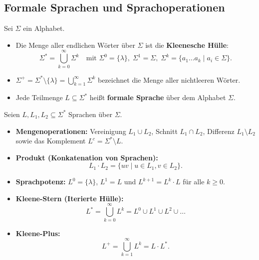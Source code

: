 \subsection{Formale Sprachen und Sprachoperationen}

\begin{definition}
    Sei $\Sigma$ ein Alphabet.
    \begin{itemize}
        \item Die Menge aller endlichen Wörter über $\Sigma$ ist die \textbf{Kleenesche Hülle}:
        \[
            \Sigma^* = \bigcup_{k=0}^\infty \Sigma^k \quad \text{mit } \Sigma^0 = \{\lambda\}, \; \Sigma^1 = \Sigma, \; \Sigma^k = \{a_1 \dots a_k \mid a_i \in \Sigma\}.
        \]
        \item $\Sigma^+ = \Sigma^* \setminus \{\lambda\} = \bigcup_{k=1}^\infty \Sigma^k$ bezeichnet die Menge aller nichtleeren Wörter.
        \item Jede Teilmenge $L \subseteq \Sigma^*$ heißt \textbf{formale Sprache} über dem Alphabet $\Sigma$.
    \end{itemize}
\end{definition}

\begin{definition}[Sprachoperationen]
    Seien $L, L_1, L_2 \subseteq \Sigma^*$ Sprachen über $\Sigma$.
    \begin{itemize}
        \item \textbf{Mengenoperationen:}
        Vereinigung $L_1 \cup L_2$, Schnitt $L_1 \cap L_2$, Differenz $L_1 \setminus L_2$ sowie das Komplement $L^c = \Sigma^* \setminus L$.
        \item \textbf{Produkt (Konkatenation von Sprachen):}
        \[
            L_1 \cdot L_2 = \{uv \mid u \in L_1, v \in L_2\}.
        \]
        \item \textbf{Sprachpotenz:}
        $L^0 = \{\lambda\}$, $L^1 = L$ und $L^{k+1} = L^k \cdot L$ für alle $k \ge 0$.
        \item \textbf{Kleene-Stern (Iterierte Hülle):}
        \[
            L^* = \bigcup_{k=0}^\infty L^k = L^0 \cup L^1 \cup L^2 \cup \dots
        \]
        \item \textbf{Kleene-Plus:}
        \[
            L^+ = \bigcup_{k=1}^\infty L^k = L \cdot L^*.
        \]
    \end{itemize}
\end{definition}

